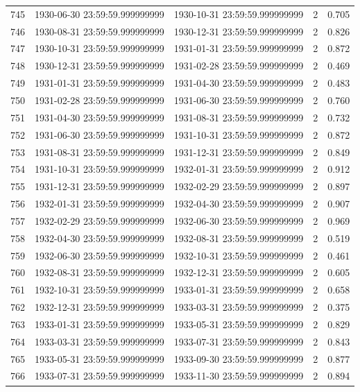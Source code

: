 \begin{table}
\begin{tabular}{lcccc}
745 & 1930-06-30 23:59:59.999999999 & 1930-10-31 23:59:59.999999999 & 2 & 0.705 \\
746 & 1930-08-31 23:59:59.999999999 & 1930-12-31 23:59:59.999999999 & 2 & 0.826 \\
747 & 1930-10-31 23:59:59.999999999 & 1931-01-31 23:59:59.999999999 & 2 & 0.872 \\
748 & 1930-12-31 23:59:59.999999999 & 1931-02-28 23:59:59.999999999 & 2 & 0.469 \\
749 & 1931-01-31 23:59:59.999999999 & 1931-04-30 23:59:59.999999999 & 2 & 0.483 \\
750 & 1931-02-28 23:59:59.999999999 & 1931-06-30 23:59:59.999999999 & 2 & 0.760 \\
751 & 1931-04-30 23:59:59.999999999 & 1931-08-31 23:59:59.999999999 & 2 & 0.732 \\
752 & 1931-06-30 23:59:59.999999999 & 1931-10-31 23:59:59.999999999 & 2 & 0.872 \\
753 & 1931-08-31 23:59:59.999999999 & 1931-12-31 23:59:59.999999999 & 2 & 0.849 \\
754 & 1931-10-31 23:59:59.999999999 & 1932-01-31 23:59:59.999999999 & 2 & 0.912 \\
755 & 1931-12-31 23:59:59.999999999 & 1932-02-29 23:59:59.999999999 & 2 & 0.897 \\
756 & 1932-01-31 23:59:59.999999999 & 1932-04-30 23:59:59.999999999 & 2 & 0.907 \\
757 & 1932-02-29 23:59:59.999999999 & 1932-06-30 23:59:59.999999999 & 2 & 0.969 \\
758 & 1932-04-30 23:59:59.999999999 & 1932-08-31 23:59:59.999999999 & 2 & 0.519 \\
759 & 1932-06-30 23:59:59.999999999 & 1932-10-31 23:59:59.999999999 & 2 & 0.461 \\
760 & 1932-08-31 23:59:59.999999999 & 1932-12-31 23:59:59.999999999 & 2 & 0.605 \\
761 & 1932-10-31 23:59:59.999999999 & 1933-01-31 23:59:59.999999999 & 2 & 0.658 \\
762 & 1932-12-31 23:59:59.999999999 & 1933-03-31 23:59:59.999999999 & 2 & 0.375 \\
763 & 1933-01-31 23:59:59.999999999 & 1933-05-31 23:59:59.999999999 & 2 & 0.829 \\
764 & 1933-03-31 23:59:59.999999999 & 1933-07-31 23:59:59.999999999 & 2 & 0.843 \\
765 & 1933-05-31 23:59:59.999999999 & 1933-09-30 23:59:59.999999999 & 2 & 0.877 \\
766 & 1933-07-31 23:59:59.999999999 & 1933-11-30 23:59:59.999999999 & 2 & 0.894 \\

\end{tabular}
\end{table}
